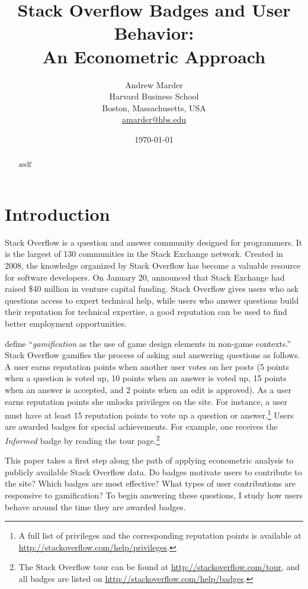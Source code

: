 \documentclass[conference]{IEEEtran}
\title{
  Stack Overflow Badges and User Behavior: \\
  An Econometric Approach
}
\author{
  Andrew Marder \\
  Harvard Business School \\
  Boston, Massachusetts, USA \\
  \href{mailto:amarder@hbs.edu}{amarder@hbs.edu}
}
\date{\today}
\newcommand{\1}{\mathds{1}}
\begin{document}
\maketitle

\begin{abstract}
asdf
\end{abstract}

\section{Introduction}

Stack Overflow is a question and answer community designed for programmers. It is the largest of 130 communities in the Stack Exchange network. Created in 2008, the knowledge organized by Stack Overflow has become a valuable resource for software developers. On January 20, \citet{Spoelsky2015} announced that Stack Exchange had raised \$40 million in venture capital funding. Stack Overflow gives users who ask questions access to expert technical help, while users who answer questions build their reputation for technical expertise, a good reputation can be used to find better employment opportunities.

\citet{Deterding2011} define ``\textit{gamification} as the use of game design elements in non-game contexts.'' Stack Overflow gamifies the process of asking and answering questions as follows. A user earns reputation points when another user votes on her posts (5 points when a question is voted up, 10 points when an answer is voted up, 15 points when an answer is accepted, and 2 points when an edit is approved). As a user earns reputation points she unlocks privileges on the site. For instance, a user must have at least 15 reputation points to vote up a question or answer.\footnote{A full list of privileges and the corresponding reputation points is available at \url{http://stackoverflow.com/help/privileges}.} Users are awarded badges for special achievements. For example, one receives the \textit{Informed} badge by reading the tour page.\footnote{The Stack Overflow tour can be found at \url{http://stackoverflow.com/tour}, and all badges are listed on \url{http://stackoverflow.com/help/badges}.}

This paper takes a first step along the path of applying econometric analysis to publicly available Stack Overflow data. Do badges motivate users to contribute to the site? Which badges are most effective? What types of user contributions are responsive to gamification? To begin answering these questions, I study how users behave around the time they are awarded badges.
\end{document}
